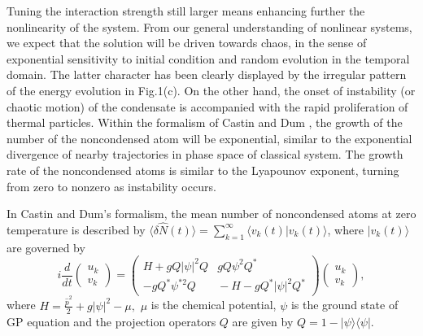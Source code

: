 \documentclass[twocolumn,prl,aps,showpacs]{revtex4}
\begin{document}
Tuning the  interaction strength still larger means  
enhancing further the nonlinearity of the system. 
From our general understanding of nonlinear 
systems,  we expect that 
the solution will
be driven towards chaos, 
in the sense of exponential sensitivity to initial condition
and random evolution in the temporal domain. 
The latter character  has been  clearly displayed by  the   
irregular pattern  of  the energy evolution in Fig.1(c). 
On the other hand,
the onset of instability (or chaotic motion)
of the condensate is accompanied with the rapid proliferation of thermal
particles.
Within
the formalism of Castin and Dum \cite
{castin}, 
the growth of the number of the noncondensed atom will be exponential, 
similar to the exponential divergence of nearby trajectories in phase 
space of classical system. The growth rate of the noncondensed atoms is
similar to the Lyapounov exponent, turning from zero to  nonzero as  
instability occurs.


In Castin and Dum's formalism,
the mean number of noncondensed atoms at zero 
temperature is  described by $\langle
\delta \hat{N}(t)\rangle =\sum_{k=1}^\infty \langle v_k(t)|v_k(t)\rangle $,
where $|v_k(t)\rangle $ are governed by 
\begin{equation}
i \frac d{dt}\left(\! 
\begin{array}{c}
u_k\\ 
v_k 
\end{array}
\!\right) =\left(\!
\begin{array}{cc}
H+gQ|\psi |^2Q &\! gQ\psi ^2Q^* \\ 
-gQ^*\psi^{*2}Q &\! -H-gQ^*|\psi |^2Q^*
\end{array}
\!\right) 
\!\left(\!
\begin{array}{c}
u_k  \\ 
v_k
\end{array}
\!\right),  \label{4}
\end{equation}
where $H=%
\frac{\hat{p}^2}{2}+g|\psi |^2-\mu,$ $\mu $ is the chemical potential, $%
\psi $ is the ground state of GP equation and the projection operators $Q$ are given by $Q=1-|\psi \rangle \langle \psi |.$
\end{document}
